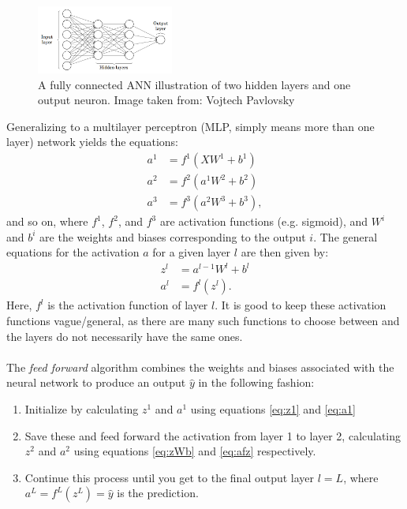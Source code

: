             \begin{figure}[H]
                \centering
                \includegraphics[width=0.4\textwidth]{figures/MLP2.png}
                \caption{A fully connected ANN illustration of two hidden layers and one output neuron. Image taken from: Vojtech Pavlovsky}
                \label{fig:MLP_full}
            \end{figure}
            Generalizing to a multilayer perceptron (MLP, simply means more than one layer) network yields the equations:
            \begin{align}
                a^1 &= f^1\left(X W^1 + b^1\right) \\
                a^2 &= f^2\left(a^1 W^2 + b^2\right) \\
                a^3 &= f^3\left(a^2 W^3 + b^3\right),
            \end{align}
            and so on, where $f^1$, $f^2$, and $f^3$ are activation functions (e.g. sigmoid), and $W^i$ and $b^i$ are the weights and biases corresponding to the output $i$. The general equations for the activation $a$ for a given layer $l$ are then given by:
            \begin{align}\label{eq:zWb}
                z^l &= a^{l-1}W^l + b^l\\\label{eq:afz}
                a^l &= f^l(z^l).
            \end{align}
            Here, $f^l$ is the activation function of layer $l$. It is good to keep these activation functions vague/general, as there are many such functions to choose between and the layers do not necessarily have the same ones.\\\\
            The \textit{feed forward} algorithm combines the weights and biases associated with the neural network to produce an output $\hat{y}$ in the following fashion:
            \begin{enumerate}
                \item Initialize by calculating $z^1$ and $a^1$ using equations \ref{eq:z1} and \ref{eq:a1}
                \item Save these and feed forward the activation from layer 1 to layer 2, calculating $z^2$ and $a^2$ using equations \ref{eq:zWb} and \ref{eq:afz} respectively.
                \item Continue this process until you get to the final output layer $l=L$, where $a^L=f^L(z^L)=\hat{y}$ is the prediction.
            \end{enumerate}
